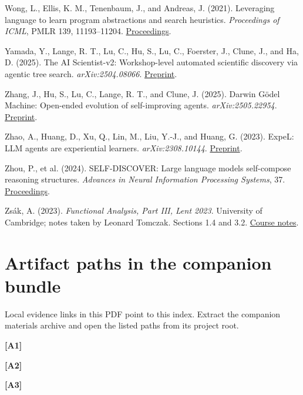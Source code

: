 \documentclass[twoside,11pt]{article}
\begin{document}
Wong, L., Ellis, K. M., Tenenbaum, J., and Andreas, J. (2021). Leveraging language to learn program abstractions and search heuristics. \emph{Proceedings of ICML}, PMLR 139, 11193–11204. \href{https://proceedings.mlr.press/v139/wong21a.html}{Proceedings}.


Yamada, Y., Lange, R. T., Lu, C., Hu, S., Lu, C., Foerster, J., Clune, J., and Ha, D. (2025). The AI Scientist-v2: Workshop-level automated scientific discovery via agentic tree search. \emph{arXiv:2504.08066}. \href{https://arxiv.org/abs/2504.08066}{Preprint}.


Zhang, J., Hu, S., Lu, C., Lange, R. T., and Clune, J. (2025). Darwin Gödel Machine: Open-ended evolution of self-improving agents. \emph{arXiv:2505.22954}. \href{https://arxiv.org/abs/2505.22954}{Preprint}.


Zhao, A., Huang, D., Xu, Q., Lin, M., Liu, Y.-J., and Huang, G. (2023). ExpeL: LLM agents are experiential learners. \emph{arXiv:2308.10144}. \href{https://arxiv.org/abs/2308.10144}{Preprint}.


Zhou, P., et al. (2024). SELF-DISCOVER: Large language models self-compose reasoning structures. \emph{Advances in Neural Information Processing Systems}, 37. \href{https://proceedings.nips.cc/paper_files/paper/2024/hash/e41efb03e20ca3c231940a3c6917ef6f-Abstract-Conference.html}{Proceedings}.


Zsák, A. (2023). \emph{Functional Analysis, Part III, Lent 2023}. University of Cambridge; notes taken by Leonard Tomczak. Sections 1.4 and 3.2. \href{https://math.berkeley.edu/~ltomczak/notes/Lent2023/FuncAna_Notes.pdf}{Course notes}.


\endgroup

\clearpage

\section*{Artifact paths in the companion bundle}
Local evidence links in this PDF point to this index. Extract the companion materials archive and open the listed paths from its project root.

\par\hypertarget{artifact-1}{}\textbf{[A1]} 

\par\hypertarget{artifact-2}{}\textbf{[A2]} 

\par\hypertarget{artifact-3}{}\textbf{[A3]} 
\end{document}
